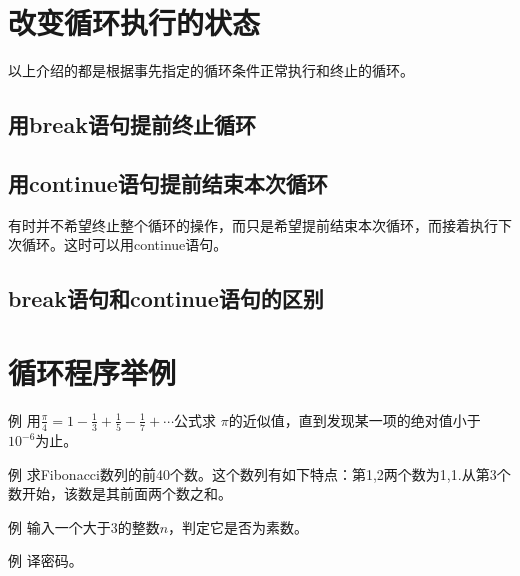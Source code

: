 \section{改变循环执行的状态}
以上介绍的都是根据事先指定的循环条件正常执行和终止的循环。
\subsection{用break语句提前终止循环}
\subsection{用continue语句提前结束本次循环}
有时并不希望终止整个循环的操作，而只是希望提前结束本次循环，而接着执行下次循环。这时可以用continue语句。
\subsection{break语句和continue语句的区别}
\section{循环程序举例}
例 用$\frac{\pi}{4} =1 - \frac{1}{3} + \frac{1}{5}- \frac{1}{7} + \cdots$公式求 $\pi$的近似值，直到发现某一项的绝对值小于 $10^{-6}$为止。

例 求Fibonacci数列的前40个数。这个数列有如下特点：第1,2两个数为1,1.从第3个数开始，该数是其前面两个数之和。

例 输入一个大于3的整数$n$，判定它是否为素数。

例 译密码。

